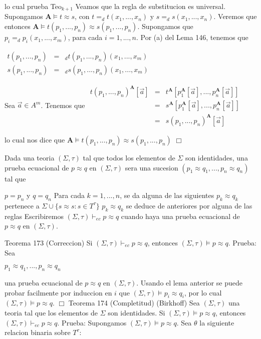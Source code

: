lo cual prueba Teo\(_{k+1}\)
Veamos que la regla de substitucion es universal. Supongamos \(\mathbf{A} \models t\approx s\), con \(t=_{d}t(x_{1},...,x_{n})\) y \( s=_{d}s(x_{1},...,x_{n})\). Veremos que entonces \(\mathbf{A}\models t(p_{1},...,p_{n})\approx s(p_{1},...,p_{n}).\) Supongamos que \( p_{i}=_{d}p_{i}(x_{1},...,x_{m})\), para cada \(i=1,...,n.\) Por (a) del Lema 146, tenemos que

\(\displaystyle \begin{array}{rcl} t(p_{1},...,p_{n}) & =& _{d}t(p_{1},...,p_{n})(x_{1},...,x_{m}) \\ s(p_{1},...,p_{n}) & =& _{d}s(p_{1},...,p_{n})(x_{1},...,x_{m}) \end{array} \)

Sea \(\vec{a}\in A^{m}\). Tenemos que
\(\displaystyle \begin{array}{rcl} t(p_{1},...,p_{n})^{\mathbf{A}}\left[ \vec{a}\right] & = & t^{\mathbf{A}} \left[ p_{1}^{\mathbf{A}}\left[ \vec{a}\right] ,...,p_{n}^{\mathbf{A}}\left[ \vec{a}\right] \right] \\ & = & s^{\mathbf{A}}\left[ p_{1}^{\mathbf{A}}\left[ \vec{a}\right] ,...,p_{n}^{\mathbf{A}}\left[ \vec{a}\right] \right] \\ & = & s(p_{1},...,p_{n})^{\mathbf{A}}\left[ \vec{a}\right] \end{array} \)

lo cual nos dice que \(\mathbf{A}\models t(p_{1},...,p_{n})\approx s(p_{1},...,p_{n})\) \(\Box\)
\( \)

Dada una teoria \((\Sigma ,\tau )\) tal que todos los elementos de \(\Sigma \) son identidades, una prueba ecuacional de \(p\approx q\) en \((\Sigma ,\tau )\) sera una sucesion \((p_{1}\approx q_{1},...,p_{n}\approx q_{n})\) tal que

\(p=p_{n}\) y \(q=q_{n}\)
Para cada \(k=1,...,n\), se da alguna de las siguientes
\(p_{k}\approx q_{k}\) pertenece a \(\Sigma \cup \{s\approx s:s\in T^{\tau }\}\)
\(p_{k}\approx q_{k}\) se deduce de anteriores por alguna de las reglas
Escribiremos \((\Sigma ,\tau )\vdash _{ec}p\approx q\) cuando haya una prueba ecuacional de \(p\approx q\) en \((\Sigma ,\tau ).\)

Teorema 173 (Correccion) Si \((\Sigma ,\tau )\vdash _{ec}p\approx q\), entonces \((\Sigma ,\tau )\models p\approx q\).
Prueba: Sea

\(\displaystyle p_{1}\approx q_{1},...,p_{n}\approx q_{n} \)

una prueba ecuacional de \(p\approx q\) en \((\Sigma ,\tau ).\) Usando el lema anterior se puede probar facilmente por induccion en \(i\) que \((\Sigma ,\tau )\models p_{i}\approx q_{i}\), por lo cual \((\Sigma ,\tau )\models p\approx q. \) \(\Box\)
Teorema 174 (Completitud) (Birkhoff) Sea \((\Sigma ,\tau )\) una teoria tal que los elementos de \(\Sigma \) son identidades. Si \((\Sigma ,\tau )\models p\approx q \), entonces \((\Sigma ,\tau )\vdash _{ec}p\approx q.\)
Prueba: Supongamos \((\Sigma ,\tau )\models p\approx q.\) Sea \(\theta \) la siguiente relacion binaria sobre \(T^{\tau }\):

